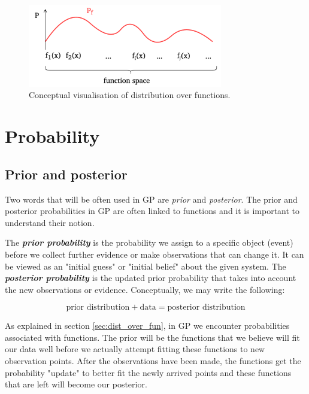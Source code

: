 \documentclass[10pt,twocolumn]{article}
\begin{document}
\begin{figure}[H]
\centering\includegraphics[width=8.5cm]{distr_over_fun.png}
\caption{Conceptual visualisation of distribution over functions.}
\label{fig:distr_over_fun}
\end{figure}

\section{Probability}

\subsection{Prior and posterior}

Two words that will be often used in GP are \textit{prior} and \textit{posterior}. The prior and posterior probabilities in GP are often linked to functions and it is important to understand their notion.

The \textbf{\textit{prior probability}} is the probability we assign to a specific object (event) before we collect further evidence or make observations that can change it. It can be viewed as an "initial guess" or "initial belief" about the given system. The \textbf{\textit{posterior probability}} is the updated prior probability that takes into account the new observations or evidence. Conceptually, we may write the following:

\begin{equation}
\text{prior distribution} + \text{data} = \text{posterior distribution}
\end{equation}

As explained in section \ref{sec:dist_over_fun}, in GP we encounter probabilities associated with functions. The prior will be the functions that we believe will fit our data well before we actually attempt fitting these functions to new observation points. After the observations have been made, the functions get the probability "update" to better fit the newly arrived points and these functions that are left will become our posterior.


\end{document}
